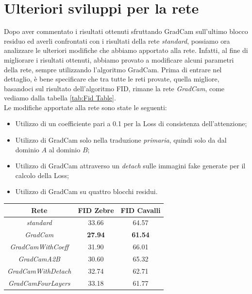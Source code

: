 \section{Ulteriori sviluppi per la rete}
Dopo aver commentato i risultati ottenuti sfruttando GradCam sull'ultimo blocco residuo ed averli confrontati con i risultati della rete \emph{standard}, possiamo ora analizzare le ulteriori modifiche che abbiamo apportato alla rete. Infatti, al fine di migliorare i risultati ottenuti, abbiamo provato a modificare alcuni parametri della rete, sempre utilizzando l'algoritmo GradCam. Prima di entrare nel dettaglio, è bene specificare che tra tutte le reti provate, quella migliore, basandoci sul risultato dell'algoritmo FID, rimane la rete \emph{GradCam}, come vediamo dalla tabella \ref{tab:Fid Table}.
\\Le modifiche apportate alla rete sono state le seguenti:
\begin{itemize}
\item Utilizzo di un coefficiente pari a 0.1 per la Loss di consistenza dell'attenzione;
\item Utilizzo di GradCam solo nella traduzione \emph{primaria}, quindi solo da dal dominio $A$ al dominio $B$;
\item Utilizzo di GradCam attraverso un \emph{detach} sulle immagini fake generate per il calcolo della Loss;
\item Utilizzo di GradCam su quattro blocchi residui.
\end{itemize}



\begin{center}
\begin{tabular}{ | c | c | c | }
\hline
\textbf{Rete}          & \textbf{FID Zebre}        &   \textbf{FID Cavalli}    \\
\hline
\emph{standard}          & 33.66     & 64.57  \\ \hline
\emph{GradCam}           & \textbf{27.94}     & \textbf{61.54}  \\ \hline
\emph{GradCamWithCoeff}  & 31.90     & 66.01  \\ \hline
\emph{GradCamA2B}        & 30.60     & 65.32  \\ \hline
\emph{GradCamWithDetach} & 32.74     & 62.71  \\ \hline
\emph{GradCamFourLayers}   & 33.18     & 61.77  \\ \hline
\end{tabular}
\label{tab:Fid Table}
\end{center}

